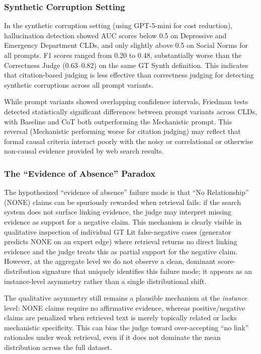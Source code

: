 \subsubsection{Synthetic Corruption Setting}

In the synthetic corruption setting (using GPT-5-mini for cost reduction), hallucination detection showed AUC scores below 0.5 on Depressive and Emergency Department CLDs, and only slightly above 0.5 on Social Norms for all prompts. F1 scores ranged from 0.20 to 0.48, substantially worse than the Correctness Judge (0.63--0.82) on the same GT Synth definition. This indicates that citation-based judging is less effective than correctness judging for detecting synthetic corruptions across all prompt variants.

While prompt variants showed overlapping confidence intervals, Friedman tests detected statistically significant differences between prompt variants across CLDs, with Baseline and CoT both outperforming the Mechanistic prompt. This reversal (Mechanistic performing worse for citation judging) may reflect that formal causal criteria interact poorly with the noisy or correlational or otherwise non-causal evidence provided by web search results.

\subsubsection{The ``Evidence of Absence'' Paradox}

The hypothesized ``evidence of absence'' failure mode is that ``No Relationship'' (NONE) claims can be spuriously rewarded when retrieval fails: if the search system does not surface linking evidence, the judge may interpret missing evidence as support for a negative claim. This mechanism is clearly visible in qualitative inspection of individual GT Lit false-negative cases (generator predicts NONE on an expert edge) where retrieval returns no direct linking evidence and the judge treats this as partial support for the negative claim. However, at the aggregate level we do not observe a clean, dominant score-distribution signature that uniquely identifies this failure mode; it appears as an instance-level asymmetry rather than a single distributional shift.

The qualitative asymmetry still remains a plausible mechanism at the \textit{instance} level: NONE claims require no affirmative evidence, whereas positive/negative claims are penalized when retrieved text is merely topically related or lacks mechanistic specificity. This can bias the judge toward over-accepting ``no link'' rationales under weak retrieval, even if it does not dominate the mean distribution across the full dataset.

